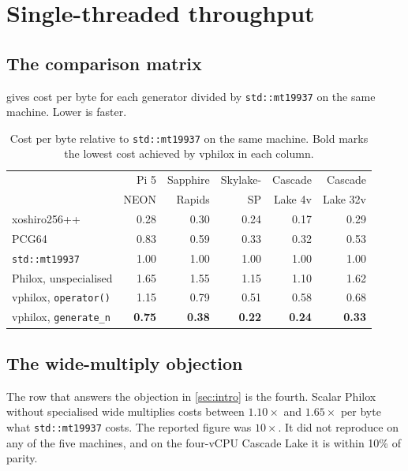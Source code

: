 \documentclass[acmsmall,screen,review]{acmart}
\theoremstyle{acmdefinition}
\newcommand{\code}[1]{\texttt{#1}}
\begin{document}
\section{Single-threaded throughput}\label{sec:single}

\subsection{The comparison matrix}

 gives cost per byte for each generator divided by
\code{std::mt19937} on the same machine. Lower is faster.

\begin{table}[t]
\centering
\caption{Cost per byte relative to \code{std::mt19937} on the same machine.
Bold marks the lowest cost achieved by vphilox in each column.}\label{tab:matrix}
\begin{tabular}{lrrrrr}
\toprule
 & Pi 5 & Sapphire & Skylake- & Cascade & Cascade \\
 & NEON & Rapids   & SP       & Lake 4v & Lake 32v \\
\midrule
xoshiro256++            & 0.28 & 0.30 & 0.24 & 0.17 & 0.29 \\
PCG64                   & 0.83 & 0.59 & 0.33 & 0.32 & 0.53 \\
\code{std::mt19937}     & 1.00 & 1.00 & 1.00 & 1.00 & 1.00 \\
Philox, unspecialised   & 1.65 & 1.55 & 1.15 & 1.10 & 1.62 \\
vphilox, \code{operator()} & 1.15 & 0.79 & 0.51 & 0.58 & 0.68 \\
vphilox, \code{generate\_n} & \textbf{0.75} & \textbf{0.38} & \textbf{0.22} & \textbf{0.24} & \textbf{0.33} \\
\bottomrule
\end{tabular}
\end{table}

\subsection{The wide-multiply objection}

The row that answers the objection in \cref{sec:intro} is the fourth. Scalar
Philox without specialised wide multiplies costs between $1.10\times$ and
$1.65\times$ per byte what \code{std::mt19937} costs. The reported figure was
$10\times$. It did not reproduce on any of the five machines, and on the
four-vCPU Cascade Lake it is within 10\% of parity.
\end{document}
